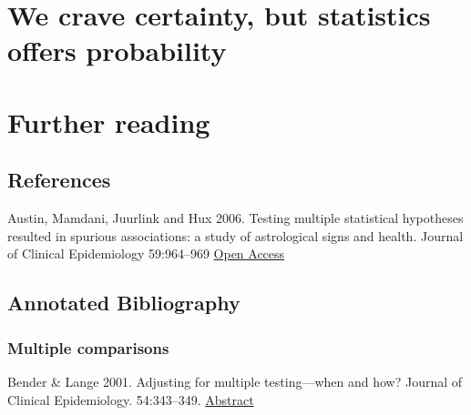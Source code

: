 \documentclass[]{book}
\theoremstyle{definition}
\theoremstyle{definition}
\theoremstyle{definition}
\theoremstyle{remark}
\begin{document}
\section{We crave certainty, but statistics offers
probability}\label{we-crave-certainty-but-statistics-offers-probability}

\section{Further reading}\label{further-reading}

\subsection{References}\label{references}

Austin, Mamdani, Juurlink and Hux 2006. Testing multiple statistical
hypotheses resulted in spurious associations: a study of astrological
signs and health. Journal of Clinical Epidemiology 59:964--969
\href{https://www.jclinepi.com/article/S0895-4356(06)00124-7/abstract?code=jce-site}{Open
Access}

\subsection{Annotated Bibliography}\label{annotated-bibliography}

\subsubsection{Multiple comparisons}\label{multiple-comparisons}

Bender \& Lange 2001. Adjusting for multiple testing---when and how?
Journal of Clinical Epidemiology. 54:343--349.
\href{https://www.jclinepi.com/article/S0895-4356(00)00314-0/abstract?code=jce-site}{Abstract}
\end{document}

